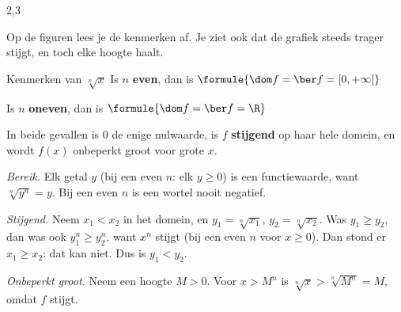 \begin{alleenvoor}{2,3}

Op de figuren lees je de kenmerken af. Je ziet ook dat de grafiek steeds trager stijgt, en toch elke hoogte haalt.

\begin{theorie}
\begin{stelling}{Kenmerken van $\sqrt[n]{x}$}
Is $n$ \textbf{\textcolor{accent}{even}}, dan is \quad $\formule{\dom f = \ber f = \left[0, +\infty\right[}$

Is $n$ \textbf{\textcolor{accent}{oneven}}, dan is \quad $\formule{\dom f = \ber f = \R}$

In beide gevallen is $0$ de enige nulwaarde, is $f$ \textbf{\textcolor{accent}{stijgend}} op haar hele domein, en wordt $f(x)$ onbeperkt groot voor grote $x$.
\end{stelling}

\begin{bewijs}
\textit{Bereik.} Elk getal $y$ (bij een even $n$: elk $y \geqslant 0$) is een functiewaarde, want $\sqrt[n]{y^n} = y$. Bij een even $n$ is een wortel nooit negatief.

\textit{Stijgend.} Neem $x_1 < x_2$ in het domein, en $y_1 = \sqrt[n]{x_1}$, $y_2 = \sqrt[n]{x_2}$. Was $y_1 \geqslant y_2$, dan was ook $y_1^n \geqslant y_2^n$, want $x^n$ stijgt (bij een even $n$ voor $x \geqslant 0$). Dan stond er $x_1 \geqslant x_2$: dat kan niet. Dus is $y_1 < y_2$.

\textit{Onbeperkt groot.} Neem een hoogte $M > 0$. Voor $x > M^n$ is $\sqrt[n]{x} > \sqrt[n]{M^n} = M$, omdat $f$ stijgt.
\end{bewijs}
\end{theorie}


\end{alleenvoor}
